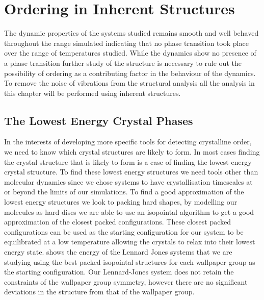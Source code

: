 \chapter{Ordering in Inherent Structures}

The dynamic properties of the systems studied remains smooth and well behaved throughout the range simulated indicating that no phase transition took place over the range of temperatures studied. While the dynamics show no presence of a phase transition further study of the structure is necessary to rule out the possibility of ordering as a contributing factor in the behaviour of the dynamics. To remove the noise of vibrations from the structural analysis all the analysis in this chapter will be performed using inherent structures.


\section{The Lowest Energy Crystal Phases}

In the interests of developing more specific tools for detecting crystalline order, we need to know which crystal structures are likely to form. In most cases finding the crystal structure that is likely to form is a case of finding the lowest energy crystal structure. To find these lowest energy structures we need tools other than molecular dynamics since we chose systems to have crystallisation timescales at or beyond the limits of our simulations. To find a good approximation of the lowest energy structures we look to packing hard shapes, by modelling our molecules as hard discs we are able to use an isopointal algorithm to get a good approximation of the closest packed configurations. These closest packed configurations can be used as the starting configuration for our system to be equilibrated at a low temperature allowing the crystals to relax into their lowest energy state.  shows the energy of the Lennard Jones systems that we are studying using the best packed isopointal structures for each wallpaper group as the starting configuration. Our Lennard-Jones system does not retain the constraints of the wallpaper group symmetry, however there are no significant deviations in the structure from that of the wallpaper group.

